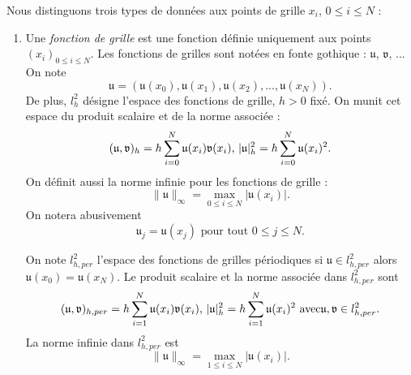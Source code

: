Nous distinguons trois types de données aux points de grille $x_i$, $0 \leq i \leq N$ :
\begin{enumerate}
\item Une \textit{fonction de grille} est une fonction définie uniquement aux points $(x_i)_{0 \leq i \leq N}$. Les fonctions de grilles sont notées en fonte gothique : $\mathfrak{u}$, $\mathfrak{v}$, ... 
On note
\begin{equation}
\mathfrak{u} = (\mathfrak{u}(x_0), \mathfrak{u}(x_1), \mathfrak{u}(x_2), ... , \mathfrak{u}(x_N)).
\end{equation}
De plus, $l^2_h$ désigne l'espace des fonctions de grille, $h>0$ fixé.
On munit cet espace du produit scalaire et de la norme associée :
\begin{equation}
(\mathfrak{u},\mathfrak{v})_h = h \displaystyle\sum\limits_{i=0}^N \mathfrak{u}(x_i) \mathfrak{v}(x_i) \text{,  } |\mathfrak{u}|_h^2 = h \displaystyle\sum\limits_{i=0}^N \mathfrak{u}(x_i)^2.
\end{equation}
On définit aussi la norme infinie pour les fonctions de grille :
\begin{equation}
\| \mathfrak{u} \|_{\infty} = \max_{0\leq i \leq N} |\mathfrak{u}(x_i)|.
\end{equation}
On notera abusivement 
\begin{equation}
\mathfrak{u}_j = \mathfrak{u}(x_j) \text{ pour tout } 0\leq j \leq N.  
\end{equation}

On note $l^2_{h,per}$ l'espace des fonctions de grilles périodiques si $\mathfrak{u} \in l^2_{h,per}$ alors $\mathfrak{u}(x_0) = \mathfrak{u}(x_N)$. Le produit scalaire et la norme associée dans $l^2_{h,per}$ sont
\begin{equation}
(\mathfrak{u},\mathfrak{v})_{h,per} = h \displaystyle\sum\limits_{i=1}^N \mathfrak{u}(x_i) \mathfrak{v}(x_i) \text{,  } |\mathfrak{u}|_h^2 = h \displaystyle\sum\limits_{i=1}^N \mathfrak{u}(x_i)^2 \text{ avec} \mathfrak{u}, \mathfrak{v} \in l^2_{h,per}.
\end{equation}
La norme infinie dans $l^2_{h,per}$ est
\begin{equation}
\| \mathfrak{u} \|_{\infty} = \max_{1\leq i \leq N} |\mathfrak{u}(x_i)|.
\end{equation}


\end{enumerate}

